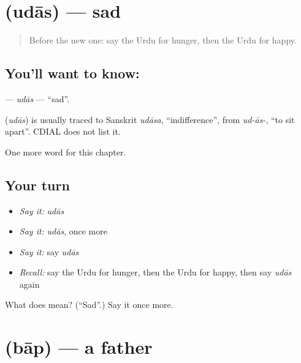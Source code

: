 \section[\texorpdfstring{\ur{اداس} (udās)}{اداس (udās)}]{ (udās) — sad}

\label{lesson:UR-C42-udas}



\begin{quote}
Before the new one: say the Urdu for hunger, then the Urdu for happy.
\end{quote}

\subsection*{You'll want to know: }
\textbf{} — \emph{udās} — \textquotedblleft{}sad\textquotedblright{}.

\begin{cousinweb}
\textbf{} (\emph{udās}) is usually traced to Sanskrit \emph{udāsa}, \textquotedblleft{}indifference\textquotedblright{}, from \emph{ud-ās-}, \textquotedblleft{}to sit apart\textquotedblright{}. CDIAL does not list it.
\end{cousinweb}

\begin{grammarlens}[title={What you've built}]
One more word for this chapter.
\end{grammarlens}

\subsection*{Your turn}
\begin{itemize}
\raggedright
  \item \emph{Say it:} \emph{udās}
  \item \emph{Say it:} \emph{udās}, once more
  \item \emph{Say it:} say \emph{udās}
  \item \emph{Recall:} say the Urdu for hunger, then the Urdu for happy, then say \emph{udās} again
\end{itemize}

\begin{tcolorbox}[breakable,colback=teal!4,colframe=teal!35!black,title={Before you move on}]
What does  mean? (\textquotedblleft{}Sad\textquotedblright{}.) Say it once more.
\end{tcolorbox}
\section[\texorpdfstring{\ur{باپ} (bāp)}{باپ (bāp)}]{ (bāp) — a father}

